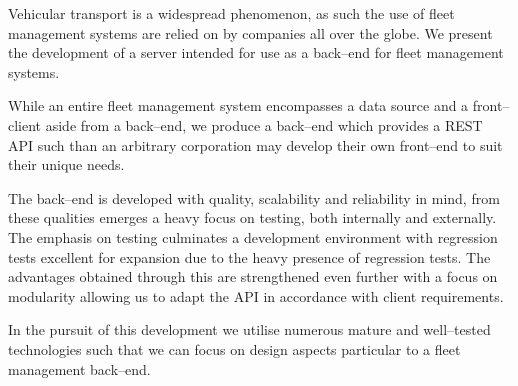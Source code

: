Vehicular transport is a widespread phenomenon, as such the use of fleet management systems are relied on by companies all over the globe.
We present the development of a server intended for use as a back--end for fleet management systems.

\bigskip \noindent
While an entire fleet management system encompasses a data source and a front--client aside from a back--end, we produce a back--end which provides a REST API such than an arbitrary corporation may develop their own front--end to suit their unique needs.

\bigskip \noindent
The back--end is developed with quality, scalability and reliability in mind, from these qualities emerges a heavy focus on testing, both internally and externally.
The emphasis on testing culminates a development environment with regression tests excellent for expansion due to the heavy presence of regression tests.
The advantages obtained through this are strengthened even further with a focus on modularity allowing us to adapt the API in accordance with client requirements.

\bigskip \noindent
In the pursuit of this development we utilise numerous mature and well--tested technologies such that we can focus on design aspects particular to a fleet management back--end.
